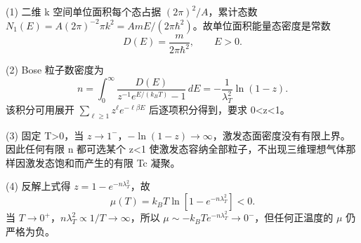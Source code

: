 (1) 二维 k 空间单位面积每个态占据 \((2\pi)^2/A\)，累计态数 \(N_1(E)=A(2\pi)^{-2}\pi k^2=AmE/(2\pi\hbar^2)\)。故单位面积能量态密度是常数
\[
D(E)=\frac m{2\pi\hbar^2},\qquad E>0.
\]

(2) Bose 粒子数密度为
\[
n=\int_0^\infty\frac{D(E)}{z^{-1}e^{E/(k_BT)}-1}\,dE
=-\frac1{\lambda_T^2}\ln(1-z).
\]
该积分可用展开 \(\sum_{\ell\ge1}z^\ell e^{-\ell\beta E}\) 后逐项积分得到，要求 0<z<1。

(3) 固定 T>0，当 \(z\to 1^{-}\)，\(-\ln(1-z)\to\infty\)，激发态面密度没有有限上界。因此任何有限 n 都可选某个 z<1 使激发态容纳全部粒子，不出现三维理想气体那样因激发态饱和而产生的有限 Tc 凝聚。

(4) 反解上式得 \(z=1-e^{-n\lambda_T^2}\)，故
\[
\mu(T)=k_BT\ln[1-e^{-n\lambda_T^2}]<0.
\]
当 \(T\to 0^{+}\)，\(n\lambda_T^2\propto1/T\to\infty\)，所以 \(\mu\sim-k_BT e^{-n\lambda_T^2}\to0^-\)，但任何正温度的 \(\mu\) 仍严格为负。
